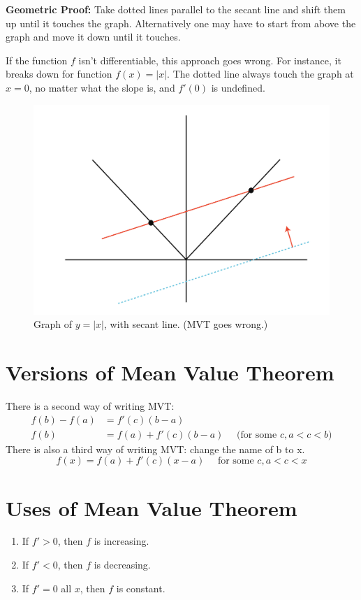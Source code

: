 \textbf{Geometric Proof: } Take dotted lines parallel to the secant line and shift them up until it touches the graph.
Alternatively one may have to start from above the graph and move it down until it touches.

If the function $f$ isn't differentiable, this approach goes wrong.
For instance, it breaks down for function $f(x) = |x|$. 
The dotted line always touch the graph at $x=0$, no matter what the slope is, and $f'(0)$ is undefined.

\begin{figure}[ht!]
	\centering
	\includegraphics[scale=0.7]{./images/lecture_9_figure_2.png}
	\caption{Graph of $y = |x|$, with secant line. (MVT goes wrong.)}
\end{figure}

\section{Versions of Mean Value Theorem}

There is a second way of writing MVT:
\begin{align*}
	f(b) - f(a) & = f'(c)(b-a) \\ 
	f(b) & = f(a) + f'(c)(b-a) \quad \text{ (for some $c, a < c < b$)}
\end{align*}
There is also a third way of writing MVT: change the name of b to x.
$$ \boxed{ f(x) = f(a) + f'(c)(x-a) \quad \text{ for some } c, a < c < x } $$


\section{Uses of Mean Value Theorem}

\begin{enumerate}
	\item If $f' > 0$, then $f$ is increasing.
	\item If $f' < 0$, then $f$ is decreasing.
	\item If $f' = 0$ all $x$, then $f$ is constant.
\end{enumerate}